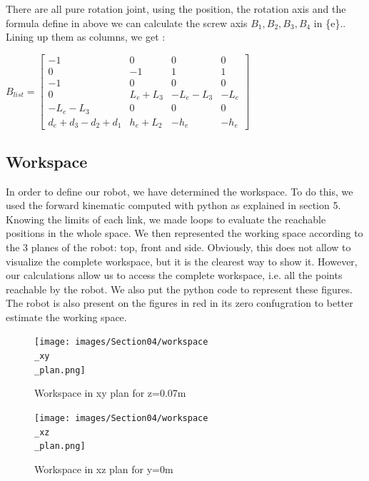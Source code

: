 \bigbreak
There are all pure rotation joint, using the position, the rotation axis and the formula define in above we can calculate the screw axis $B_1,B_2,B_3,B_4$ in \{e\}.. Lining up them as columns, we get : 

\begin{center}
    $B_{list} = 
    \begin{bmatrix}
        -1 & 0 & 0 & 0 \\
        0 & -1 & 1 & 1 \\
        -1 & 0 & 0 & 0 \\
        0 & L_e+L_3 & -L_e-L_3 & -L_e \\
        -L_e-L_3 & 0 & 0 & 0 \\
        d_e+d_3-d_2+d_1 & h_e+L_2 & -h_e & -h_e
    \end{bmatrix}
    $
\end{center}

\subsection{Workspace}

\hspace{\parindent} In order to define our robot, we have determined the workspace. To do this, we used the forward kinematic computed with python as explained in section 5. Knowing the limits of each link, we made loops to evaluate the reachable positions in the whole space. We then represented the working space according to the 3 planes of the robot: top, front and side. Obviously, this does not allow to visualize the complete workspace, but it is the clearest way to show it. However, our calculations allow us to access the complete workspace, i.e. all the points reachable by the robot. We also put the python code to represent these figures. The robot is also present on the figures in red in its zero confugration to better estimate the working space.

\begin{figure}[ht]
    \centering
    \texttt{[image: images/Section04/workspace\\\_xy\\\_plan.png]}
    \caption{Workspace in xy plan for z=0.07m}
    \label{fig:mesh22}
\end{figure}
\FloatBarrier

\begin{figure}[ht]
    \centering
    \texttt{[image: images/Section04/workspace\\\_xz\\\_plan.png]}
    \caption{Workspace in xz plan for y=0m}
    \label{fig:mesh23}
\end{figure}
\FloatBarrier

